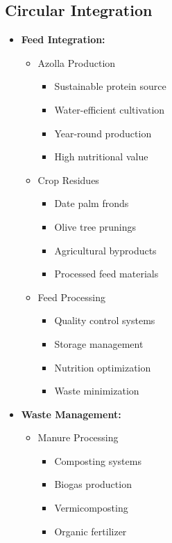 \subsection{Circular Integration}
\begin{itemize}
    \item \textbf{Feed Integration:}
    \begin{itemize}
        \item Azolla Production
        \begin{itemize}
            \item Sustainable protein source
            \item Water-efficient cultivation
            \item Year-round production
            \item High nutritional value
        \end{itemize}
        
        \item Crop Residues
        \begin{itemize}
            \item Date palm fronds
            \item Olive tree prunings
            \item Agricultural byproducts
            \item Processed feed materials
        \end{itemize}
        
        \item Feed Processing
        \begin{itemize}
            \item Quality control systems
            \item Storage management
            \item Nutrition optimization
            \item Waste minimization
        \end{itemize}
    \end{itemize}
    
    \item \textbf{Waste Management:}
    \begin{itemize}
        \item Manure Processing
        \begin{itemize}
            \item Composting systems
            \item Biogas production
            \item Vermicomposting
            \item Organic fertilizer
        \end{itemize}
        

\end{itemize}
\end{itemize}
